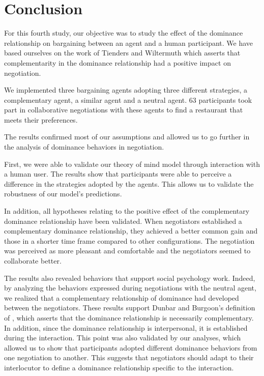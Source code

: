 \documentclass[10pt, a4paper]{article} %
\begin{document}
					
\section{Conclusion}

For this fourth study, our objective was to study the effect of the dominance relationship on bargaining between an agent and a human participant. We have based ourselves on the work of Tienders and Wiltermuth \cite{wiltermuth2009benefits,tiedens2003power} which asserts that complementarity in the dominance relationship had a positive impact on negotiation. 

We implemented three bargaining agents adopting three different strategies, a complementary agent, a similar agent and a neutral agent. 
63 participants took part in collaborative negotiations with these agents to find a restaurant that meets their preferences. 

The results confirmed most of our assumptions and allowed us to go further in the analysis of dominance behaviors in negotiation. 

First, we were able to validate our theory of mind model through interaction with a human user. 
The results show that participants were able to perceive a difference in the strategies adopted by the agents. This allows us to validate the robustness of our model's predictions. 

In addition, all hypotheses relating to the positive effect of the complementary dominance relationship have been validated. When negotiators established a complementary dominance relationship, they achieved a better common gain and those in a shorter time frame compared to other configurations. The negotiation was perceived as more pleasant and comfortable and the negotiators seemed to collaborate better. 

The results also revealed behaviors that support social psychology work. Indeed, by analyzing the behaviors expressed during negotiations with the neutral agent, we realized that a complementary relationship of dominance had developed between the negotiators. These results support Dunbar and Burgoon's definition of \cite{dunbar2005perceptions}, which asserts that the dominance relationship is necessarily complementary. In addition, since the dominance relationship is interpersonal, it is established during the interaction. This point was also validated by our analyses, which allowed us to show that participants adopted different dominance behaviors from one negotiation to another. This suggests that negotiators should adapt to their interlocutor to define a dominance relationship specific to the interaction. 			

\printbibliography[title={Bibliography}] %

\end{document}
